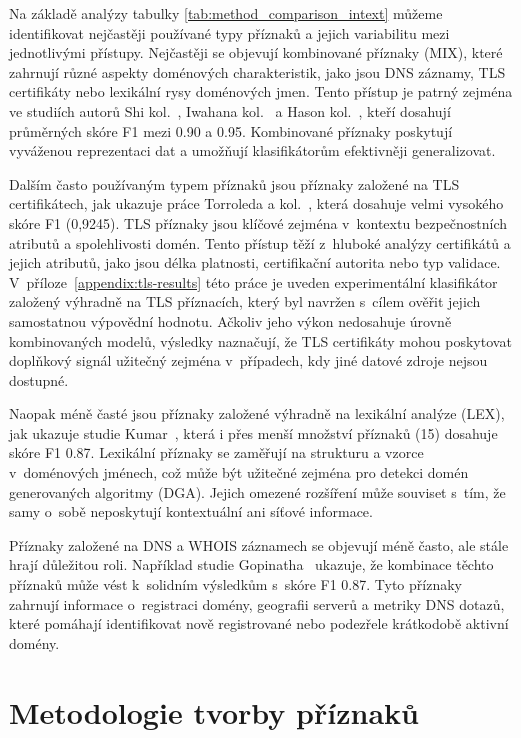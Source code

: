 Na základě analýzy tabulky \ref{tab:method_comparison_intext} můžeme identifikovat nejčastěji používané typy příznaků a jejich variabilitu mezi jednotlivými přístupy. Nejčastěji se objevují kombinované příznaky (MIX), které zahrnují různé aspekty doménových charakteristik, jako jsou DNS záznamy, TLS certifikáty nebo lexikální rysy doménových jmen. Tento přístup je patrný zejména ve studiích autorů Shi kol. \cite{Shit}, Iwahana kol. \cite{max2020madmax} a Hason kol. \cite{hason2020robust}, kteří dosahují průměrných skóre F1 mezi 0.90 a 0.95. Kombinované příznaky poskytují vyváženou reprezentaci dat a umožňují klasifikátorům efektivněji generalizovat.

Dalším často používaným typem příznaků jsou příznaky založené na TLS certifikátech, jak ukazuje práce Torroleda a kol.~\cite{torroledo2018hunting}, která dosahuje velmi vysokého skóre F1 (0{,}9245). TLS příznaky jsou klíčové zejména v~kontextu bezpečnostních atributů a spolehlivosti domén. Tento přístup těží z~hluboké analýzy certifikátů a jejich atributů, jako jsou délka platnosti, certifikační autorita nebo typ validace. V~příloze~\ref{appendix:tls-results} této práce je uveden experimentální klasifikátor založený výhradně na TLS příznacích, který byl navržen s~cílem ověřit jejich samostatnou výpovědní hodnotu. Ačkoliv jeho výkon nedosahuje úrovně kombinovaných modelů, výsledky naznačují, že TLS certifikáty mohou poskytovat doplňkový signál užitečný zejména v~případech, kdy jiné datové zdroje nejsou dostupné.


Naopak méně časté jsou příznaky založené výhradně na lexikální analýze (LEX), jak ukazuje studie Kumar \cite{kumar}, která i přes menší množství příznaků (15) dosahuje skóre F1 0.87. Lexikální příznaky se zaměřují na strukturu a vzorce v~doménových jménech, což může být užitečné zejména pro detekci domén generovaných algoritmy (DGA). Jejich omezené rozšíření může souviset s~tím, že samy o~sobě neposkytují kontextuální ani síťové informace.

Příznaky založené na DNS a WHOIS záznamech se objevují méně často, ale stále hrají důležitou roli. Například studie Gopinatha \cite{gopinath2020whois} ukazuje, že kombinace těchto příznaků může vést k~solidním výsledkům s~skóre F1 0.87. Tyto příznaky zahrnují informace o~registraci domény, geografii serverů a metriky DNS dotazů, které pomáhají identifikovat nově registrované nebo podezřele krátkodobě aktivní domény.





\section{Metodologie tvorby příznaků} \label{sec:feature-engineering-methodology}

